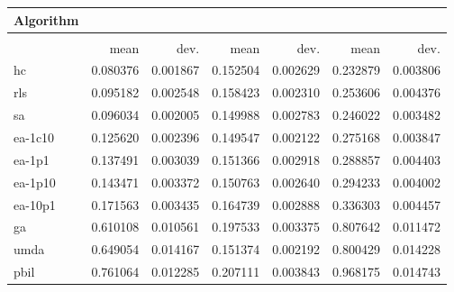\begin{tabular}{@{} l *{6}{>{{}}N{1}{2}} @{}}
\toprule
{Algorithm} &  \\
\midrule
&  &  &  \\
\midrule
& {mean} & {dev.} & {mean} & {dev.} & {mean} & {dev.} \\
\midrule
hc & 0.080376 & 0.001867 & 0.152504 & 0.002629 & 0.232879 & 0.003806 \\
rls & 0.095182 & 0.002548 & 0.158423 & 0.002310 & 0.253606 & 0.004376 \\
sa & 0.096034 & 0.002005 & 0.149988 & 0.002783 & 0.246022 & 0.003482 \\
ea-1c10 & 0.125620 & 0.002396 & 0.149547 & 0.002122 & 0.275168 & 0.003847 \\
ea-1p1 & 0.137491 & 0.003039 & 0.151366 & 0.002918 & 0.288857 & 0.004403 \\
ea-1p10 & 0.143471 & 0.003372 & 0.150763 & 0.002640 & 0.294233 & 0.004002 \\
ea-10p1 & 0.171563 & 0.003435 & 0.164739 & 0.002888 & 0.336303 & 0.004457 \\
ga & 0.610108 & 0.010561 & 0.197533 & 0.003375 & 0.807642 & 0.011472 \\
umda & 0.649054 & 0.014167 & 0.151374 & 0.002192 & 0.800429 & 0.014228 \\
pbil & 0.761064 & 0.012285 & 0.207111 & 0.003843 & 0.968175 & 0.014743 \\
\bottomrule
\end{tabular}
